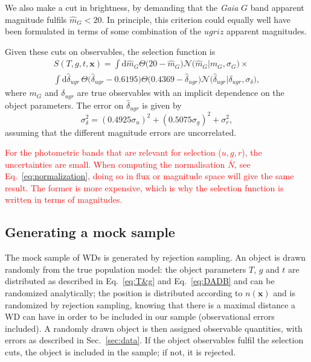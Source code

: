 \documentclass[fleqn,usenatbib]{mnras}
\newcommand{\changes}[1]{\textcolor{red}{#1}}
\newcommand{\Teff}{T}
\newcommand{\logg}{g}
\newcommand{\de}{\text{d}}
\begin{document}
We also make a cut in brightness, by demanding that the \emph{Gaia} $G$ band apparent magnitude fulfils $\hat{m}_G < 20$. In principle, this criterion could equally well have been formulated in terms of some combination of the $ugriz$ apparent magnitudes.

Given these cuts on observables, the selection function is
\begin{equation}\label{eq:selection}
\begin{split}
	S(\Teff,\logg,t,\mathbf{x}) = 
    	      \int \de \hat{m}_G \Theta \big( 20-\hat{m}_G \big)\mathcal{N}\big( \hat{m}_G | m_G,\sigma_G \big) \times \\
    \int \de \hat{\delta}_{ugr}\,
    \Theta \big( \hat{\delta}_{ugr} -0.6195 \big)
    \Theta \big( 0.4369 - \hat{\delta}_{ugr} \big)
    \mathcal{N}\big( \hat{\delta}_{ugr} | \delta_{ugr},\sigma_{\delta}\big),
\end{split}
\end{equation}
where $m_G$ and $\delta_{ugr}$ are true observables with an implicit dependence on the object parameters. The error on $\hat{\delta}_{ugr}$ is given by
\begin{equation}
	\sigma_\delta^2 = (0.4925 \sigma_u)^2 + (0.5075 \sigma_g)^2 + \sigma_r^2,
\end{equation}
assuming that the different magnitude errors are uncorrelated.

\changes{For the photometric bands that are relevant for selection ($u,g,r$), the uncertainties are small. When computing the normalisation $\bar{N}$, see Eq.~\eqref{eq:normalization}, doing so in flux or magnitude space will give the same result. The former is more expensive, which is why the selection function is written in terms of magnitudes.}


\subsection{Generating a mock sample}

The mock sample of WDs is generated by rejection sampling. An object is drawn randomly from the true population model: the object parameters $\Teff$, $\logg$ and $t$ are distributed as described in Eq.~\eqref{eq:T&g} and Eq.~\eqref{eq:DADB} and can be randomized analytically; the position is distributed according to $n(\mathbf{x})$ and is randomized by rejection sampling, knowing that there is a maximal distance a WD can have in order to be included in our sample (observational errors included). A randomly drawn object is then assigned observable quantities, with errors as described in Sec.~\ref{sec:data}. If the object observables fulfil the selection cuts, the object is included in the sample; if not, it is rejected.
\end{document}
